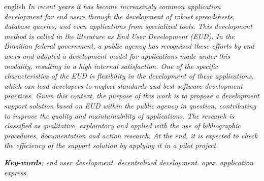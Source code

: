 \begin{resumo}[Abstract]
 \begin{otherlanguage*}{english}
   \textit{In recent years it has become increasingly common application development for end users through the development of robust spreadsheets, database queries, and even applications from specialized tools. This development method is called in the literature as End User Development (EUD). In the Brazilian federal government, a public agency has recognized these efforts by end users and adopted a development model for applications made under this modality, resulting in a high internal satisfaction. One of the specific characteristics of the EUD is flexibility in the development of these applications, which can lead developers to neglect standards and best software development practices. Given this context, the purpose of this work is to propose a development support solution based on EUD within the public agency in question, contributing to improve the quality and maintainability of applications. The research is classified as qualitative, exploratory and applied with the use of bibliographic procedures, documentation and action research. At the end, it is expected to check the efficiency of the support solution by applying it in a pilot project.}

   \vspace{\onelineskip}
 
   \noindent 
   \textit{\textbf{Key-words}: end user development. decentralized development. apex. application express.}
 \end{otherlanguage*}
\end{resumo}